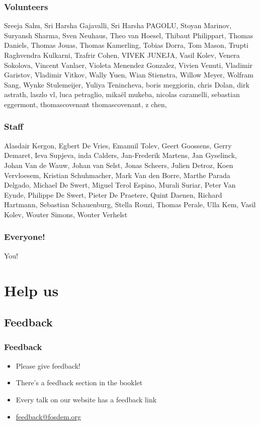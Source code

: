 \documentclass[aspectratio=169]{beamer}
\begin{document}
\begin{frame}
	\frametitle{Volunteers}
	Sreeja Sahu, Sri Harsha Gajavalli, Sri Harsha PAGOLU, Stoyan Marinov, Suryansh Sharma, Sven Neuhaus, Theo van Hoesel, Thibaut Philippart, Thomas Daniels, Thomas Jouas, Thomas Kamerling, Tobias Dorra, Tom Mason, Trupti Raghvendra Kulkarni, Tzafrir Cohen, VIVEK JUNEJA, Vasil Kolev, Venera Sokolova, Vincent Vanlaer, Violeta Menendez Gonzalez, Vivien Venuti, Vladimir Garistov, Vladimir Vitkov, Wally Yuen, Wian Stienstra, Willow Meyer, Wolfram Sang, Wynke Stulemeijer, Yuliya Tenincheva, boris meggiorin, chris Dolan, dirk astrath, laszlo vl, luca petraglio, mikaël mukeba, nicolas caramelli, sebastian eggermont, thomascovenant thomascovenant, z chen, 
\end{frame}

\begin{frame}
	\frametitle{Staff}
	\vfill
	Alasdair Kergon, Egbert De Vries, Emanuil Tolev, Geert Goossens, Gerry Demaret, Ieva Supjeva, inda Calders, Jan-Frederik Martens, Jan Gyselinck, Johan Van de Wauw, Johan van Selst, Jonas Scheers, Julien Detroz, Koen Vervloesem, Kristian Schuhmacher, Mark Van den Borre, Marthe Parada Delgado, Michael De Swert, Miguel Terol Espino, Murali Suriar, Peter Van Eynde, Philippe De Swert, Pieter De Praetere, Quint Daenen, Richard Hartmann, Sebastian Schauenburg, Stella Rouzi, Thomas Perale, Ulla Kem, Vasil Kolev, Wouter Simons, Wouter Verhelst
	\vfill
\end{frame}

\begin{frame}
	\frametitle{Everyone!}
	\vfill
	\begin{center}
	{\Huge You!}
	\end{center}
	\vfill
\end{frame}


\section{Help us}

\subsection{Feedback}

\begin{frame}
	\frametitle{Feedback}
	\vfill
	\begin{itemize}
		\item Please give feedback!
		\item There's a feedback section in the booklet
		\item Every talk on our website has a feedback link
		\item \url{feedback@fosdem.org}
	\end{itemize}
	\vfill
\end{frame}
\end{document}
